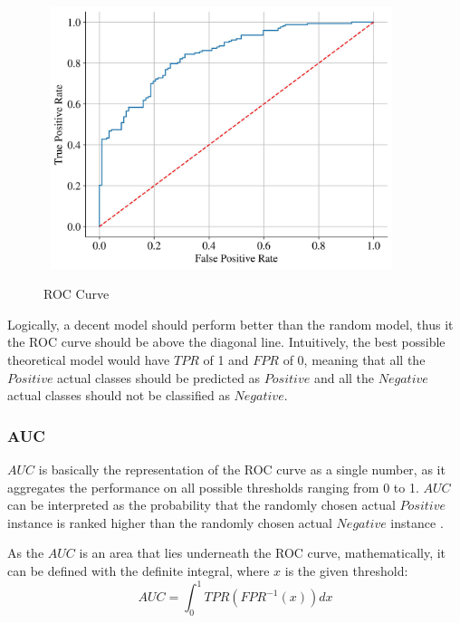  \begin{figure}[H]
    \centering
    \caption{ROC Curve}\vspace{0.5em}
    \label{fig:roccurvetheory}\
    \includegraphics[width=100mm]{Figures/ROC_theory.jpg}

    \vspace{-1em}
\end{figure}

Logically, a decent model should perform better than the random model, thus it the ROC curve should be above the diagonal line.
Intuitively, the best possible theoretical model would have $TPR$ of 1 and $FPR$ of 0, meaning that all the $Positive$ actual classes should be predicted as $Positive$ and all the $Negative$ actual classes should not be classified as $Negative$.
 \newpage
\subsubsection{AUC}

$AUC$ is basically the representation of the ROC curve as a single number, as it aggregates the performance on all possible thresholds ranging from 0 to 1.
$AUC$ can be interpreted as the probability that the randomly chosen actual $Positive$ instance is ranked higher than the randomly chosen actual $Negative$ instance \citep{janitza2013auc}.


As the $AUC$ is an area that lies underneath the ROC curve, mathematically, it can be defined with the definite integral, where $x$ is the given threshold:
\begin{equation}\label{eq}
AUC = \int_{0}^{1} TPR \left(FPR^{-1}\left(x \right)\right) dx
\end{equation}



